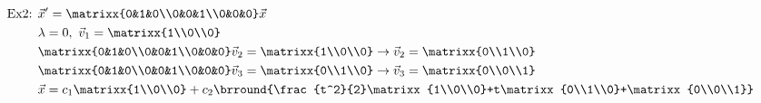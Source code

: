\begin{align*}
    \text{Ex2: }&\vec{x}'=\matrixx{0&1&0\\0&0&1\\0&0&0}\vec{x}\\
    &\lambda=0,\ \vec{v}_1=\matrixx{1\\0\\0}\\
    &\matrixx{0&1&0\\0&0&1\\0&0&0}\vec{v}_2=\matrixx{1\\0\\0}\to \vec{v}_2=\matrixx{0\\1\\0}\\
    &\matrixx{0&1&0\\0&0&1\\0&0&0}\vec{v}_3=\matrixx{0\\1\\0}\to\vec{v}_3=\matrixx{0\\0\\1}\\
    &\vec{x}=c_1\matrixx{1\\0\\0}+c_2\brround{\frac{t^2}{2}\matrixx{1\\0\\0}+t\matrixx{0\\1\\0}+\matrixx{0\\0\\1}}
\end{align*}
